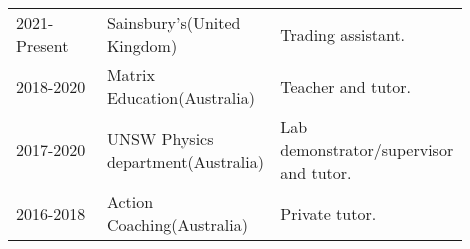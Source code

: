 \begin{tabular}{p{0.2\linewidth} p{0.3\linewidth} p{0.4\linewidth}}
2021-Present & Sainsbury's\newline (United Kingdom) & Trading assistant.\vspace{0.7cm}\\
2018-2020 & Matrix Education\newline (Australia) & Teacher and tutor.\vspace{0.7cm}\\
2017-2020 & UNSW Physics department\newline (Australia) & Lab demonstrator/supervisor and tutor.\vspace{0.7cm}\\
2016-2018 & Action Coaching\newline (Australia) & Private tutor.\vspace{0.7cm}\\
\end{tabular}






